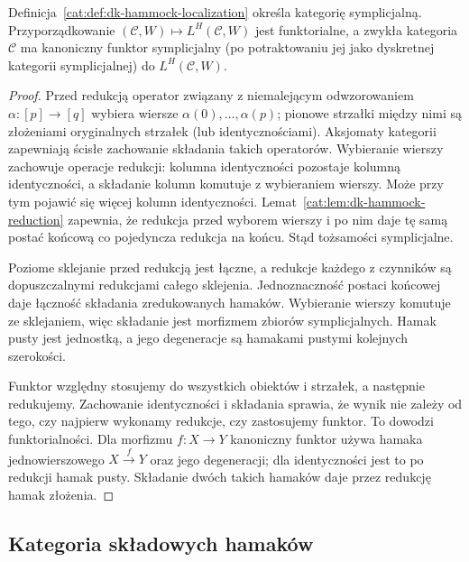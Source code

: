 \begin{stwierdzenie}\label{cat:prop:dk-hammock-category}
Definicja~\ref{cat:def:dk-hammock-localization} określa kategorię symplicjalną. Przyporządkowanie $(\mathcal C,W)\mapsto L^H(\mathcal C,W)$ jest funktorialne, a zwykła kategoria $\mathcal C$ ma kanoniczny funktor symplicjalny (po potraktowaniu jej jako dyskretnej kategorii symplicjalnej) do $L^H(\mathcal C,W)$.
\end{stwierdzenie}
\begin{proof}
Przed redukcją operator związany z niemalejącym odwzorowaniem $\alpha:[p]\to[q]$ wybiera wiersze $\alpha(0),\ldots,\alpha(p)$; pionowe strzałki między nimi są złożeniami oryginalnych strzałek (lub identycznościami). Aksjomaty kategorii zapewniają ścisłe zachowanie składania takich operatorów. Wybieranie wierszy zachowuje operacje redukcji: kolumna identyczności pozostaje kolumną identyczności, a składanie kolumn komutuje z wybieraniem wierszy. Może przy tym pojawić się więcej kolumn identyczności. Lemat~\ref{cat:lem:dk-hammock-reduction} zapewnia, że redukcja przed wyborem wierszy i po nim daje tę samą postać końcową co pojedyncza redukcja na końcu. Stąd tożsamości symplicjalne.

Poziome sklejanie przed redukcją jest łączne, a redukcje każdego z czynników są dopuszczalnymi redukcjami całego sklejenia. Jednoznaczność postaci końcowej daje łączność składania zredukowanych hamaków. Wybieranie wierszy komutuje ze sklejaniem, więc składanie jest morfizmem zbiorów symplicjalnych. Hamak pusty jest jednostką, a jego degeneracje są hamakami pustymi kolejnych szerokości.

Funktor względny stosujemy do wszystkich obiektów i strzałek, a następnie redukujemy. Zachowanie identyczności i składania sprawia, że wynik nie zależy od tego, czy najpierw wykonamy redukcje, czy zastosujemy funktor. To dowodzi funktorialności. Dla morfizmu $f:X\to Y$ kanoniczny funktor używa hamaka jednowierszowego $X\xrightarrow{f}Y$ oraz jego degeneracji; dla identyczności jest to po redukcji hamak pusty. Składanie dwóch takich hamaków daje przez redukcję hamak złożenia.
\end{proof}

\subsection{Kategoria składowych hamaków}

